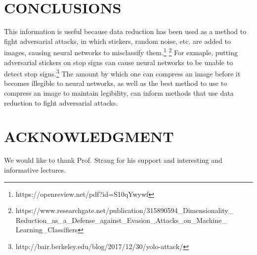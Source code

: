 \documentclass[letterpaper, 10 pt, conference]{ieeeconf}  %
\begin{document}
\section{CONCLUSIONS}

This information
is useful because data reduction has been used as a method to fight 
adversarial attacks, in which stickers, random noise, etc. are added to images,
causing neural networks to misclassify them.\footnote{https://openreview.net/pdf?id=S10qYwywf}
\footnote{https://www.researchgate.net/publication/315890594\_Dimensionality\_ Reduction\_as\_a\_Defense\_against\_Evasion\_Attacks\_on\_Machine\_ Learning\_Classifiers}
For exmaple, putting adversarial stickers on stop signs
can cause neural networks to be unable to detect stop signs.\footnote{http://bair.berkeley.edu/blog/2017/12/30/yolo-attack/}
The amount by which one can compress an image before it becomes 
illegible to neural networks, as well as the best method to use to compress an 
image to maintain legibility, can inform methods that use data reduction
to fight adversarial attacks.

\addtolength{\textheight}{-12cm}   %


\section*{ACKNOWLEDGMENT}

We would like to thank Prof. Strang for his support and interesting and informative lectures.
\end{document}
